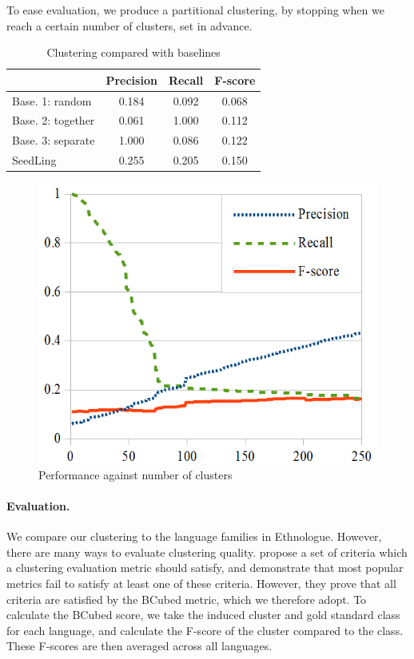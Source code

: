 To ease evaluation, we produce a partitional clustering, by stopping when we reach a certain number of clusters, set in advance.

\begin{table}[t]
\centering
    \begin{tabular}{l|ccc}
    ~        & Precision & Recall       & F-score    \\ \hline
	Base. 1: random	& 0.184	& 0.092	& 0.068 \\
	Base. 2: together	& 0.061	& 1.000	& 0.112 \\
	Base. 3: separate	& 1.000	& 0.086	& 0.122 \\ \hline
	SeedLing	& 0.255	& 0.205	& 0.150 
    \end{tabular}
\caption{Clustering compared with baselines}
\label{table:cluster}
\end{table}

\begin{figure}[t]
\begin{centering}
\includegraphics[scale=0.75]{performance.png}
\caption{Performance against number of clusters}
\label{fig:performance}
\end{centering}
\end{figure}

\paragraph{Evaluation.}
We compare our clustering to the language families in Ethnologue. However, there are many ways to evaluate clustering quality.  propose a set of criteria which a clustering evaluation metric should satisfy, and demonstrate that most popular metrics fail to satisfy at least one of these criteria.  However, they prove that all criteria are satisfied by the BCubed metric, which we therefore adopt.  To calculate the BCubed score, we take the induced cluster and gold standard class for each language, and calculate the F-score of the cluster compared to the class.  These F-scores are then averaged across all languages.

